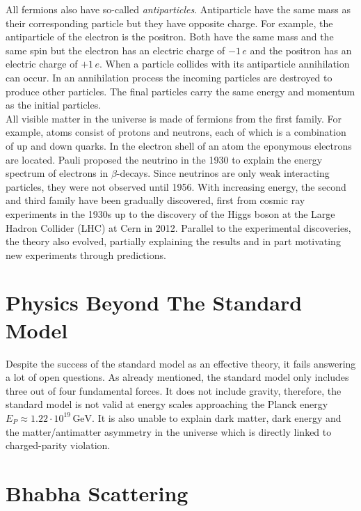\documentclass[a4paper,11pt,twosided,final,german,openbib,pdftex,listof=totoc,bibliography=totoc]{scrbook}
\begin{document}
All fermions also have so-called \textit{antiparticles}. Antiparticle have the same mass as their corresponding particle but they have opposite charge. For example, the antiparticle of the electron is the positron. Both have the same mass and the same spin but the electron has an electric charge of $-1\,e$ and the positron has an electric charge of $+1\,e$. When a particle collides with its antiparticle annihilation can occur. In an annihilation process the incoming particles are destroyed to produce other particles. The final particles carry the same energy and momentum as the initial particles.\\


All visible matter in the universe is made of fermions from the first family. For example, atoms consist of protons and neutrons, each of which is a combination of up and down quarks. In the electron shell of an atom the eponymous electrons are located. Pauli proposed the neutrino in the 1930 to explain the energy spectrum of electrons in $\beta$-decays. Since neutrinos are only weak interacting particles, they were not observed until 1956.\cite{REINES19941} With increasing energy, the second and third family have been gradually discovered, first from cosmic ray experiments in the 1930s up to the discovery of the Higgs boson at the Large Hadron Collider (LHC) at Cern in 2012. Parallel to the experimental discoveries, the theory also evolved, partially explaining the results and in part motivating new experiments through predictions.


\section{Physics Beyond The Standard Model}

Despite the success of the standard model as an effective theory, it fails answering a lot of open questions. As already mentioned, the standard model only includes three out of four fundamental forces. It does not include gravity, therefore, the standard model is not valid at energy scales approaching the Planck energy $E_P \approx 1.22\cdot 10^{19}\,\textrm{GeV} $.\cite{sivaram2007special} It is also unable to explain dark matter, dark energy and the matter/antimatter asymmetry in the universe which is directly linked to charged-parity violation.\cite{HAMBYE2012193}

\section{Bhabha Scattering}
\label{sec:Bhabha}
\end{document}
